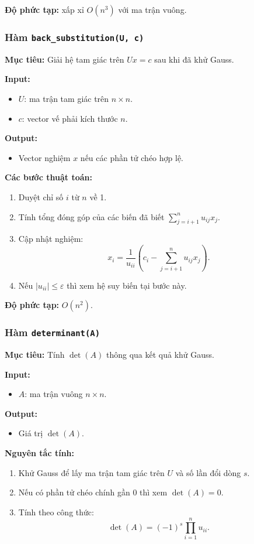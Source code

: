 \documentclass[a4paper]{article}
\begin{document}
\textbf{Độ phức tạp:} xấp xỉ \(O(n^3)\) với ma trận vuông.

\subsubsection{Hàm \texttt{back\_substitution(U, c)}}
\textbf{Mục tiêu:} Giải hệ tam giác trên \(Ux=c\) sau khi đã khử Gauss.

\textbf{Input:}
\begin{itemize}
    \item \(U\): ma trận tam giác trên \(n\times n\).
    \item \(c\): vector vế phải kích thước \(n\).
\end{itemize}

\textbf{Output:}
\begin{itemize}
    \item Vector nghiệm \(x\) nếu các phần tử chéo hợp lệ.
\end{itemize}

\textbf{Các bước thuật toán:}
\begin{enumerate}
    \item Duyệt chỉ số \(i\) từ \(n\) về 1.
    \item Tính tổng đóng góp của các biến đã biết \(\sum_{j=i+1}^{n}u_{ij}x_j\).
    \item Cập nhật nghiệm:
    \[
    x_i = \frac{1}{u_{ii}}\left(c_i - \sum_{j=i+1}^{n} u_{ij}x_j\right).
    \]
    \item Nếu \(|u_{ii}|\le\varepsilon\) thì xem hệ suy biến tại bước này.
\end{enumerate}

\textbf{Độ phức tạp:} \(O(n^2)\).

\subsubsection{Hàm \texttt{determinant(A)}}
\textbf{Mục tiêu:} Tính \(\det(A)\) thông qua kết quả khử Gauss.

\textbf{Input:}
\begin{itemize}
    \item \(A\): ma trận vuông \(n\times n\).
\end{itemize}

\textbf{Output:}
\begin{itemize}
    \item Giá trị \(\det(A)\).
\end{itemize}

\textbf{Nguyên tắc tính:}
\begin{enumerate}
    \item Khử Gauss để lấy ma trận tam giác trên \(U\) và số lần đổi dòng \(s\).
    \item Nếu có phần tử chéo chính gần 0 thì xem \(\det(A)=0\).
    \item Tính theo công thức:
    \[
    \det(A)=(-1)^s\prod_{i=1}^{n}u_{ii}.
    \]
\end{enumerate}
\end{document}
